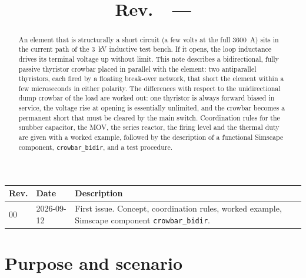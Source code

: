 \documentclass[11pt,a4paper]{article}
\title{\textbf{\doctitle}\\[6pt]\large \docsubtitle\\[10pt]\normalsize Rev.~\docrev\ --- \docdate}
\author{}
\date{}
\begin{document}
\maketitle
\thispagestyle{fancy}

\begin{center}
\begin{tabular}{@{}llp{9.5cm}@{}}
\toprule
\textbf{Rev.} & \textbf{Date} & \textbf{Description} \\
\midrule
00 & 2026-09-12 & First issue. Concept, coordination rules, worked example, Simscape component \texttt{crowbar\_bidir}. \\
\bottomrule
\end{tabular}
\end{center}

\begin{abstract}
An element that is structurally a short circuit (a few volts at the full \SI{3600}{A}) sits in
the current path of the \SI{3}{kV} inductive test bench. If it opens, the loop inductance drives
its terminal voltage up without limit. This note describes a bidirectional, fully passive
thyristor crowbar placed in parallel with the element: two antiparallel thyristors, each fired
by a floating break-over network, that short the element within a few microseconds in either
polarity. The differences with respect to the unidirectional dump crowbar of the load are
worked out: one thyristor is always forward biased in service, the voltage rise at opening is
essentially unlimited, and the crowbar becomes a permanent short that must be cleared by the
main switch. Coordination rules for the snubber capacitor, the MOV, the series reactor, the
firing level and the thermal duty are given with a worked example, followed by the description
of a functional Simscape component, \texttt{crowbar\_bidir}, and a test procedure.
\end{abstract}

\section{Purpose and scenario}
\end{document}
